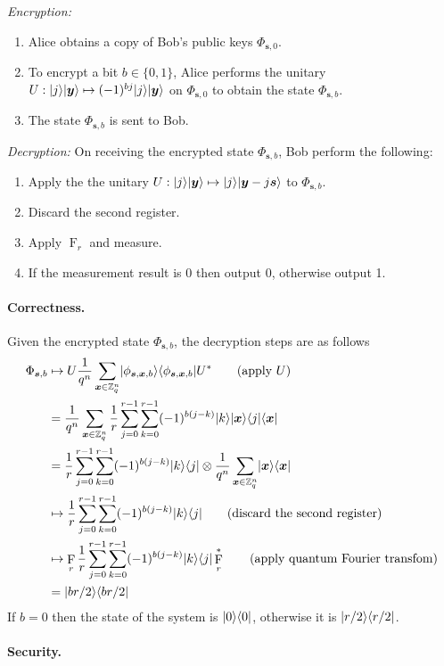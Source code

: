 \documentclass[11pt]{article}
\theoremstyle{plain}
\theoremstyle{definition}
\DeclareMathOperator{\qft}{F}
\DeclarePairedDelimiter{\ldbrac}{\lvert}{\rangle}
\DeclarePairedDelimiter{\rdbrac}{\langle}{\rvert}
\def\Z{\ensuremath{\mathbb{Z}}}
\begin{document}
\vspace*{5mm}

\textit{Encryption:}

\begin{enumerate}[topsep = 1pt, itemsep = 1pt, parsep = 1pt]
\item Alice obtains a copy of Bob's public keys $\Phi_{\bm{s}, 0}$.
\item To encrypt a bit $b \in \{ 0, 1 \}$, Alice performs the unitary $U: \ldbrac{j}\ldbrac{\bm{y}} \mapsto (-1)^{bj}\ldbrac{j}\ldbrac{\bm{y}}$ on $\Phi_{\bm{s}, 0}$ to obtain the state $\Phi_{\bm{s}, b}$.
\item The state $\Phi_{\bm{s}, b}$ is sent to Bob.
\end{enumerate}

\vspace*{5mm}

\textit{Decryption:}
On receiving the encrypted state $\Phi_{\bm{s}, b}$, Bob perform the following:
\begin{enumerate}[topsep = 1pt, itemsep = 1pt, parsep = 1pt]
\item Apply the the unitary $U: \ldbrac{j}\ldbrac{\bm{y}} \mapsto \ldbrac{j}\ldbrac{\bm{y} - j\bm{s}}$ to $\Phi_{\bm{s}, b}$.
\item Discard the second register.
\item Apply $\qft_r$ and measure.
\item If the measurement result is 0 then output 0, otherwise output 1.
\end{enumerate}

\paragraph{Correctness.} 
Given the encrypted state $\Phi_{\bm{s}, b}$, the decryption steps are as follows
\begin{align*}
    \Phi_{\bm{s}, b}
    & \mapsto U \frac{1}{q^n} \sum_{\bm{x} \in \Z_q^n} \ldbrac{\phi_{\bm{s}, \bm{x}, b}} \rdbrac{\phi_{\bm{s}, \bm{x}, b}} U^*  \tag{apply $U$} \\
    & = \frac{1}{q^n} \sum_{\bm{x} \in \Z_q^n} \frac{1}{r} \sum_{j = 0}^{r - 1} \sum_{k = 0}^{r - 1} (-1)^{b(j - k)}\ldbrac{k}\ldbrac{\bm{x}} \rdbrac{j}\rdbrac{\bm{x}} \\
    & = \frac{1}{r} \sum_{j = 0}^{r - 1} \sum_{k = 0}^{r - 1} (-1)^{b(j - k)}\ldbrac{k}\rdbrac{j} \otimes \frac{1}{q^n} \sum_{\bm{x} \in \Z_q^n} \ldbrac{\bm{x}}\rdbrac{\bm{x}} \\
    & \mapsto \frac{1}{r} \sum_{j = 0}^{r - 1} \sum_{k = 0}^{r - 1} (-1)^{b(j - k)}\ldbrac{k}\rdbrac{j} \tag{discard the second register} \\
    & \mapsto \qft_r \frac{1}{r} \sum_{j = 0}^{r - 1} \sum_{k = 0}^{r - 1} (-1)^{b(j - k)}\ldbrac{k}\rdbrac{j} \qft_r^* \tag{apply quantum Fourier transfom}\\
    & = \ldbrac{br/2} \rdbrac{br/2}
\end{align*}
If $b = 0$ then the state of the system is $\ldbrac{0} \rdbrac{0}$, otherwise it is $\ldbrac{r / 2} \rdbrac{r / 2}$. 

\paragraph{Security.}




\end{document}
